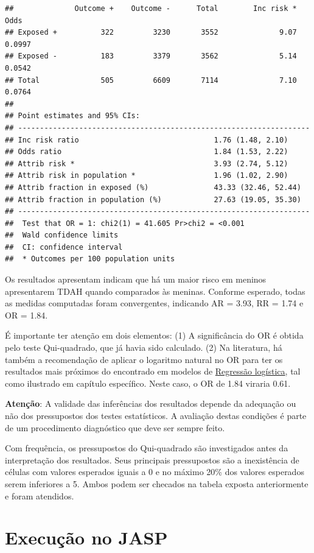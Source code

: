 \documentclass[
]{book}
\begin{document}
\begin{verbatim}
##              Outcome +    Outcome -      Total        Inc risk *        Odds
## Exposed +          322         3230       3552              9.07      0.0997
## Exposed -          183         3379       3562              5.14      0.0542
## Total              505         6609       7114              7.10      0.0764
## 
## Point estimates and 95% CIs:
## -------------------------------------------------------------------
## Inc risk ratio                               1.76 (1.48, 2.10)
## Odds ratio                                   1.84 (1.53, 2.22)
## Attrib risk *                                3.93 (2.74, 5.12)
## Attrib risk in population *                  1.96 (1.02, 2.90)
## Attrib fraction in exposed (%)               43.33 (32.46, 52.44)
## Attrib fraction in population (%)            27.63 (19.05, 35.30)
## -------------------------------------------------------------------
##  Test that OR = 1: chi2(1) = 41.605 Pr>chi2 = <0.001
##  Wald confidence limits
##  CI: confidence interval
##  * Outcomes per 100 population units
\end{verbatim}

Os resultados apresentam indicam que há um maior risco em meninos apresentarem TDAH quando comparados às meninas. Conforme esperado, todas as medidas computadas foram convergentes, indicando AR = 3.93, RR = 1.74 e OR = 1.84.

É importante ter atenção em dois elementos: (1) A significância do OR é obtida pelo teste Qui-quadrado, que já havia sido calculado. (2) Na literatura, há também a recomendação de aplicar o logaritmo natural no OR para ter os resultados mais próximos do encontrado em modelos de \protect\hyperlink{17_regressao_logistica_binaria}{Regressão logística}, tal como ilustrado em capítulo específico. Neste caso, o OR de 1.84 viraria 0.61.

\textbf{Atenção}: A validade das inferências dos resultados depende da adequação ou não dos pressupostos dos testes estatísticos. A avaliação destas condições é parte de um procedimento diagnóstico que deve ser sempre feito.

Com frequência, os pressupostos do Qui-quadrado são investigados antes da interpretação dos resultados. Seus principais pressupostos são a inexistência de células com valores esperados iguais a 0 e no máximo 20\% dos valores esperados serem inferiores a 5. Ambos podem ser checados na tabela exposta anteriormente e foram atendidos.

\hypertarget{execuuxe7uxe3o-no-jasp-2}{%
\section{Execução no JASP}\label{execuuxe7uxe3o-no-jasp-2}}
\end{document}
